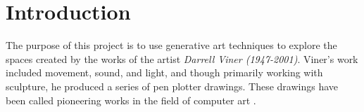 \chapter{Introduction}
The purpose of this project is to use generative art techniques to explore the
spaces created by the works of the artist \emph{Darrell Viner (1947-2001)}. Viner's work
included movement, sound, and light, and though primarily working with
sculpture, he produced a series of pen plotter drawings. These drawings have
been called pioneering works in the field of computer art \citep{viner_bio}.
